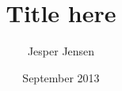 \documentclass[11pt,a4paper]{article}
\begin{document}
\title{Title here} 
\date{September 2013}
\author{Jesper Jensen}
\maketitle

\thispagestyle{fancy}
\lipsum[1-9]
\end{document}

